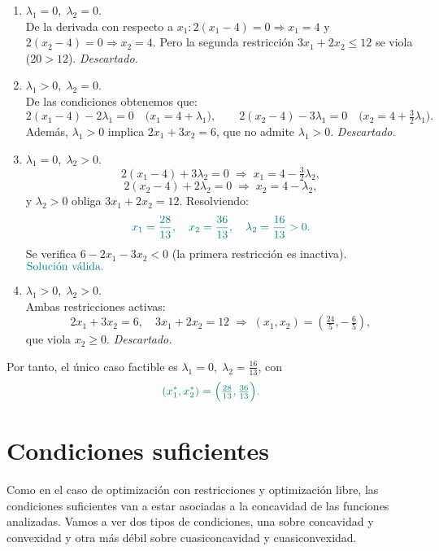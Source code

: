 \documentclass{article}
\begin{document}
\begin{enumerate}[label=\textbf{Caso \arabic*:}]
  \item \(\lambda_1=0,\;\lambda_2=0\).\\
    De la derivada con respecto a $x_1$\(:2(x_1-4)=0\Rightarrow x_1=4\) y  
    \(2(x_2-4)=0\Rightarrow x_2=4\).  
    Pero la segunda restricción \(3x_1+2x_2\le12\) se viola ($20>12$).  
    \emph{\color{teal}Descartado.}

  \item \(\lambda_1>0,\;\lambda_2=0\).\\
    De las condiciones obtenemos que:
    \[
      2(x_1-4)-2\lambda_1=0\quad\bigl(x_1=4+\lambda_1\bigr),\qquad
      2(x_2-4)-3\lambda_1=0\quad\bigl(x_2=4+\tfrac32\lambda_1\bigr).
    \]
    Además, \(\lambda_1>0\) implica \(2x_1+3x_2=6\), que no admite \(\lambda_1>0\).  
    \emph{\color{teal}Descartado.}

  \item \(\lambda_1=0,\;\lambda_2>0\).\\
    \[
     2(x_1-4)+3\lambda_2=0\;\Rightarrow\;x_1=4-\tfrac32\lambda_2,
    \]
    \[
     2(x_2-4)+2\lambda_2=0\;\Rightarrow\;x_2=4-\lambda_2,
    \]
    y \(\lambda_2>0\) obliga \(3x_1+2x_2=12\). Resolviendo:
    \[\color{teal}
      x_1=\frac{28}{13},\quad x_2=\frac{36}{13},\quad \lambda_2=\frac{16}{13}>0.
    \]
    Se verifica \(6-2x_1-3x_2<0\) (la primera restricción es inactiva).  
    \(\color{teal}{\text{\color{teal}Solución válida.}}\)

  \item \(\lambda_1>0,\;\lambda_2>0\).\\
    Ambas restricciones activas:
    \[
      2x_1+3x_2=6,\quad 3x_1+2x_2=12
      \;\Longrightarrow\;
      (x_1,x_2)=(\tfrac{24}{5},-\,\tfrac{6}{5}),
    \]
    que viola \(x_2\ge0\).  
    \emph{\color{teal}Descartado.}
\end{enumerate}

\noindent Por tanto, el único caso factible es \(\lambda_1=0,\;\lambda_2=\tfrac{16}{13}\), con  
\[\color{teal}
(x_1^*,x_2^*)=\Bigl(\tfrac{28}{13},\tfrac{36}{13}\Bigr).
\]


\section*{Condiciones suficientes}
Como en el caso de optimización con restricciones y optimización libre, las condiciones suficientes van a estar asociadas a la concavidad de las funciones analizadas. Vamos a ver dos tipos de condiciones, una sobre concavidad y convexidad y otra más débil sobre cuasiconcavidad y cuasiconvexidad.
\end{document}
